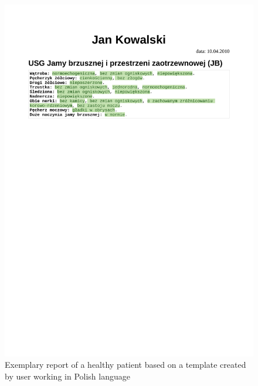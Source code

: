 \documentclass[12pt, twoside, openany]{report}
\theoremstyle{definition}
\begin{document}
\begin{figure}
	\centering
	\includegraphics[width=\linewidth, trim={0 20cm 0cm 2.5cm},clip]{rendered-report-pl}
	\caption{
		Exemplary report of a healthy patient based on a template created by user working in Polish language
		\label{fig:rendered-report-pl}
	}
\end{figure}
\end{document}
